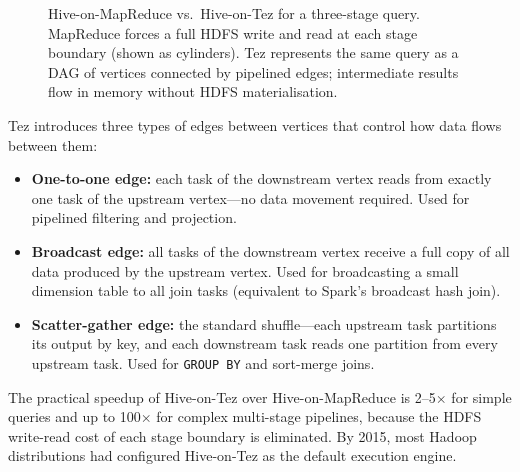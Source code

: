 \begin{figure}[h!t]
\caption{Hive-on-MapReduce vs.\ Hive-on-Tez for a three-stage query.
         MapReduce forces a full HDFS write and read at each stage boundary
         (shown as cylinders). Tez represents the same query as a DAG of vertices
         connected by pipelined edges; intermediate results flow in memory
         without HDFS materialisation.}
\label{fig:tez-vs-mr}
\end{figure}

Tez introduces three types of edges between vertices that control how data
flows between them:

\begin{itemize}
  \item \textbf{One-to-one edge:} each task of the downstream vertex reads
        from exactly one task of the upstream vertex---no data movement
        required. Used for pipelined filtering and projection.
  \item \textbf{Broadcast edge:} all tasks of the downstream vertex receive
        a full copy of all data produced by the upstream vertex. Used for
        broadcasting a small dimension table to all join tasks (equivalent
        to Spark's broadcast hash join).
  \item \textbf{Scatter-gather edge:} the standard shuffle---each upstream
        task partitions its output by key, and each downstream task reads
        one partition from every upstream task. Used for \texttt{GROUP BY}
        and sort-merge joins.
\end{itemize}

The practical speedup of Hive-on-Tez over Hive-on-MapReduce is 2--5$\times$
for simple queries and up to 100$\times$ for complex multi-stage pipelines,
because the HDFS write-read cost of each stage boundary is eliminated.
By 2015, most Hadoop distributions had configured Hive-on-Tez as the
default execution engine.

